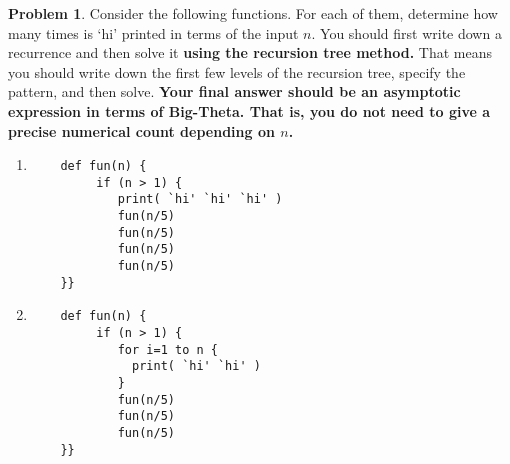 \documentclass[11pt]{article}
\theoremstyle{definition}
\theoremstyle{definition}
\newtheorem{problem}{Problem}
\theoremstyle{definition}
\begin{document}
\newpage
\begin{problem}
Consider the following functions. For each of them, determine how many times is `hi' printed in terms of the input $n$. You should first write down a recurrence and then solve it \textbf{using the recursion tree method.} That means you should write down the first few levels of the recursion tree, specify the pattern, and then solve. \textbf{Your final answer should be an asymptotic expression in terms of Big-Theta. That is, you do not need to give a precise numerical count depending on $n$.}
\end{problem}
\begin{enumerate}[label=(3\alph*)]
\item\label{3a} 
	\begin{small}
	\begin{verbatim}
	def fun(n) {
	     if (n > 1) {
	        print( `hi' `hi' `hi' )
	        fun(n/5)
	        fun(n/5)
	        fun(n/5)
	        fun(n/5)
	}}
	\end{verbatim}
	\end{small}


\pagebreak 

\item\label{3b}

\begin{small}
	\begin{verbatim}
	def fun(n) {
	     if (n > 1) {
	        for i=1 to n {
	          print( `hi' `hi' )
	        }
	        fun(n/5)
	        fun(n/5)
	        fun(n/5)
	}}
	\end{verbatim}
	\end{small}
	

\end{enumerate}
\end{document}
